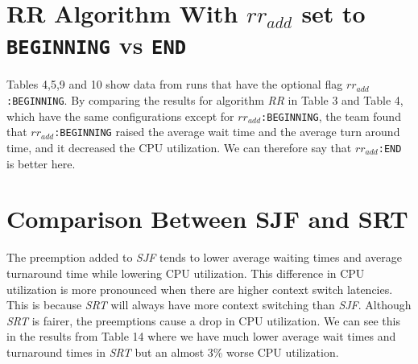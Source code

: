 \documentclass{article}
\begin{document}
\section{RR Algorithm With {\tt $rr_{add}$} set to {\tt BEGINNING} vs {\tt END}}
\begin{doublespace}
Tables 4,5,9 and 10 show data from runs that have the optional flag {\tt $rr_{add}$:BEGINNING}. 
By comparing the results for algorithm \textit{RR} in  Table 3 and Table 4, which have the same configurations except for {\tt $rr_{add}$:BEGINNING}, 
the team found that {\tt $rr_{add}$:BEGINNING} raised the average wait time and the average turn around time, and it decreased the 
CPU utilization. We can therefore say that {\tt $rr_{add}$:END} is better here. 
\end{doublespace}
\section{Comparison Between SJF and SRT}
\begin{doublespace}
The preemption added to \textit{SJF} tends to lower average waiting times and average turnaround time while lowering
CPU utilization. This difference in CPU utilization is more pronounced when there are higher context switch latencies. 
This is because \textit{SRT} will always have more context switching than \textit{SJF}. Although \textit{SRT} is fairer,
the preemptions cause a drop in CPU utilization. We can see this in the results from Table 14 where we have 
much lower average wait times and turnaround times in \textit{SRT} but an almost 3\% worse CPU utilization. 
\end{doublespace}
\end{document}
